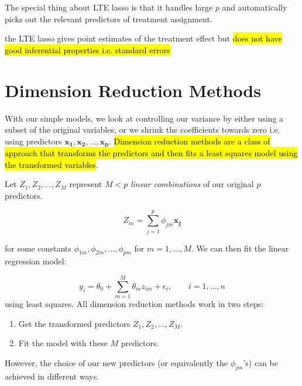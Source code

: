 \documentclass[11pt]{article}
\begin{document}
\begin{note}
    The special thing about LTE lasso is that it handles large $p$ and automatically picks out the relevant predictors of treatment assignment.
\end{note}

\begin{note}
    the LTE lasso gives point estimates of the treatment effect but \hl{does not have good inferential properties i.e. standard errors}
\end{note}

\appendix

\clearpage

\section{Dimension Reduction Methods}

\label{appendix: dimension reduction}

With our simple models, we look at controlling our variance by either using a subset of the original variables, or we shrink the coefficients towards zero i.e. using predictors $\mathbf{x_1, x_2, \ldots, x_p}$. \hl{Dimension reduction methods are a class of approach that transforms the predictors and then fits a least squares model using the transformed variables}.

\begin{definition}
    Let $Z_1, Z_2, \ldots, Z_M$ represent $M<p$ \textit{linear combinations} of our original $p$ predictors. 

    \begin{equation*}
        Z_m = \sum_{j=1}^p \phi_{jm}\mathbf{x_j}
    \end{equation*}

    for some constants $\phi_{1m}, \phi_{2m}, \ldots, \phi_{pm}$ for $m= 1, \ldots, M$. We can then fit the linear regression model:

    \begin{equation}
        \label{dim reduction lin reg}
        y_i = \theta_0 + \sum_{m=1}^M \theta_m z_{im} + \epsilon_i, \qquad i = 1, \ldots, n
    \end{equation}
    using least squares. All dimension reduction methods work in two steps:

    \begin{enumerate}
        \item Get the transformed predictors $Z_1, Z_2, \ldots, Z_M$.
        \item Fit the model with these $M$ predictors. 
    \end{enumerate}
    However, the choice of our new predictors (or equivalently the $\phi_{jm}$'s) can be achieved in different ways.
\end{definition}
\end{document}
